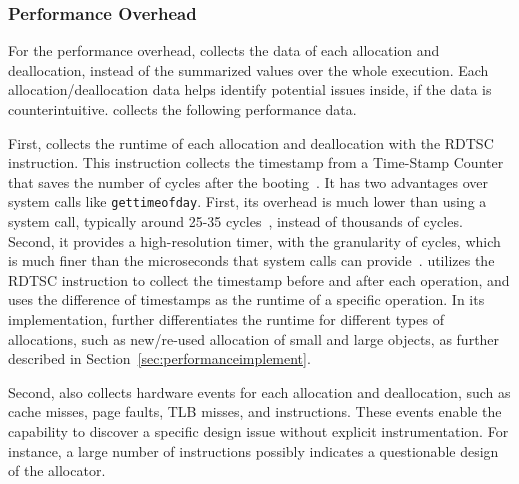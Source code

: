 \subsubsection{Performance Overhead}

For the performance overhead, \MP{} collects the  data of each allocation and deallocation, instead of the summarized values over the whole execution. Each allocation/deallocation data helps identify potential issues inside, if the data is counterintuitive. \MP{} collects the following performance data. 

First, \MP{} collects the runtime of each allocation and deallocation with the RDTSC instruction. This instruction collects the timestamp from a Time-Stamp Counter that saves the number of cycles after the booting~\cite{coorporation1997using, weaver2013linux}. It has two advantages over system calls like \texttt{gettimeofday}. First, its overhead is much lower than using a system call, typically around 25-35 cycles~\cite{rdtscoverhead}, instead of thousands of cycles. Second, it provides a high-resolution timer, with the granularity of cycles, which is much finer than the microseconds that system calls can provide~\cite{pitfallsrdtsc}. \MP{} utilizes the RDTSC instruction to collect the timestamp before and after each operation, and uses the difference of timestamps as the runtime of a specific operation. In its implementation, \MP{} further differentiates the runtime for different types of allocations, such as new/re-used allocation of small and large objects, as further described in Section~\ref{sec:performanceimplement}. 

Second, \MP{} also collects hardware events for each allocation and deallocation, such as cache misses, page faults, TLB misses, and instructions. These events enable the capability to discover a specific design issue without explicit instrumentation. For instance, a large number of instructions possibly indicates a questionable design of the allocator. 





